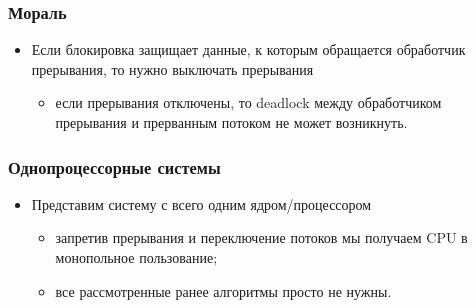 \begin{frame}
\frametitle{Мораль}
\begin{itemize}
    \item<1->Если блокировка защищает данные, к которым обращается обработчик
         прерывания, то нужно выключать прерывания
    \begin{itemize}
        \item<2->если прерывания отключены, то deadlock между обработчиком
             прерывания и прерванным потоком не может возникнуть.
    \end{itemize}
\end{itemize}
\end{frame}

\begin{frame}
\frametitle{Однопроцессорные системы}
\begin{itemize}
    \item<1->Представим систему с всего одним ядром/процессором
    \begin{itemize}
        \item<2->запретив прерывания и переключение потоков мы получаем CPU в
             монопольное пользование;
        \item<3->все рассмотренные ранее алгоритмы просто не нужны.
    \end{itemize}
\end{itemize}
\end{frame}
